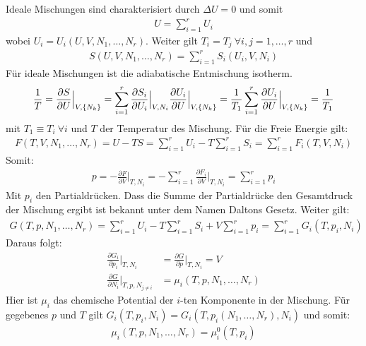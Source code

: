 Ideale Mischungen sind charakterisiert durch $\Delta U = 0$ und somit
\begin{align*}
    U = \sum_{i=1}^r U_i
\end{align*}
wobei $U_i = U_i (U,V,N_1,\dots,N_r)$. Weiter gilt $T_i = T_j \ \forall
i,j =1,\dots,r$ und
\begin{align*}
    S(U,V,N_1,\dots,N_r) = \sum_{i=1}^r S_i (U_i,V,N_i)
\end{align*}
Für ideale Mischungen ist die adiabatische Entmischung isotherm.
\begin{align*}
    \frac{1}{T} = \frac{\partial S}{\partial U} \Big|_{V,\left\{ N_k \right\}}
    = \sum_{i=1}^r \frac{\partial S_i}{\partial U_i} \Big|_{V,N_i}
        \frac{\partial U_i}{\partial U} \Big|_{V,\left\{ N_k \right\}}
    = \frac{1}{T_1} \sum_{i=1}^r \frac{\partial U_i}{\partial U} \Big|_{V,\left\{ N_k \right\}}
    = \frac{1}{T_1}
\end{align*}
mit $T_1 \equiv T_i \ \forall i$ und $T$ der Temperatur des Mischung.
Für die Freie Energie gilt:
\begin{align*}
    F(T,V,N_1,\dots,N_r) = U - T S
    = \sum_{i=1}^r U_i - T \sum_{i=1}^r S_i
    = \sum_{i=1}^r F_i (T,V,N_i)
\end{align*}
Somit:
\begin{align*}
    p = - \frac{\partial F}{\partial V} \Big|_{T,N_i}
    = - \sum_{i=1}^r \frac{\partial F_i}{\partial V} \Big|_{T,N_i}
    = \sum_{i=1}^r p_i
\end{align*}
Mit $p_i$ den Partialdrücken. Dass die Summe der Partialdrücke den Gesamtdruck
der Mischung ergibt ist bekannt unter dem Namen Daltons Gesetz. Weiter gilt:
\begin{align*}
    G(T,p,N_1,\dots,N_r)
    = \sum_{i=1}^r U_i - T \sum_{i=1}^r S_i + V \sum_{i=1}^r p_i
    = \sum_{i=1}^r G_i (T,p_i,N_i)
\end{align*}
Daraus folgt:
\begin{align*}
    \frac{\partial G_i}{\partial p_i} \Big|_{T,N_i}
    &= \frac{\partial G}{\partial p} \Big|_{T,N_i}
    = V
    \\
    \frac{\partial G}{\partial N_i} \Big|_{T,p,N_{j \neq i}}
    &= \mu_i (T,p,N_1,\dots,N_r)
\end{align*}
Hier ist $\mu_i$ das chemische Potential der $i$-ten Komponente in der
Mischung. Für gegebenes $p$ und $T$ gilt $G_i (T,p_i,N_i) = G_i (T,p_i(N_1,\dots,N_r),N_i)$
und somit:
\begin{align*}
    \mu_i (T,p,N_1,\dots,N_r)
    = \mu_i^0 (T,p_i)
\end{align*}
